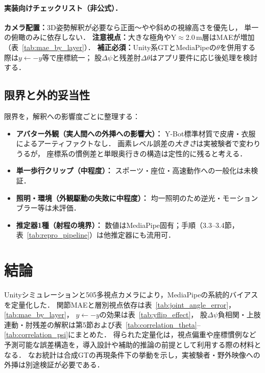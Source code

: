 \documentclass[fleqn]{ieej}
\begin{document}
\paragraph{実装向けチェックリスト（非公式）．}
\textbf{カメラ配置：}3D姿勢解釈が必要なら正面～やや斜めの視線高さを優先し，
単一の俯瞰のみに依存しない．
\textbf{注意視点：}大きな極角やY$\approx$2.0\,m層はMAEが増加（表~\ref{tab:mae_by_layer}）．
\textbf{補正必須：}Unity系GTとMediaPipeの$\theta$を併用する際は$y \leftarrow -y$等で座標統一；
股$\Delta\psi$と残差肘$\Delta\theta$はアプリ要件に応じ後処理を検討する．

\subsection{限界と外的妥当性}

限界を，解釈への影響度ごとに整理する：
\begin{itemize}\itemsep2pt
  \item \textbf{アバター外観（実人間への外挿への影響大）：}
        Y-Bot標準材質で皮膚・衣服によるアーティファクトなし．
        画素レベル誤差の\emph{大きさ}は実被験者で変わりうるが，
        座標系の慣例差と単眼奥行きの構造は定性的に残ると考える．
  \item \textbf{単一歩行クリップ（中程度）：}
        スポーツ・座位・高速動作への一般化は未検証．
  \item \textbf{照明・環境（外観駆動の失敗に中程度）：}
        均一照明のため逆光・モーションブラー等は未評価．
  \item \textbf{推定器1種（射程の境界）：}
        数値はMediaPipe固有；手順（3.3--3.4節，表~\ref{tab:repro_pipeline}）は他推定器にも流用可．
\end{itemize}

\section{結論}

Unityシミュレーションと505多視点カメラにより，MediaPipeの系統的バイアスを定量化した．
関節MAEと層別視点依存は表~\ref{tab:joint_angle_error}，\ref{tab:mae_by_layer}，
$y\leftarrow -y$の効果は表~\ref{tab:yflip_effect}，
股$\Delta\psi$負相関・上肢連動・肘残差の解釈は第5節および表~\ref{tab:correlation_theta}--\ref{tab:correlation_psi}にまとめた．
得られた定量化は，視点偏重や座標慣例など予測可能な誤差構造を，導入設計や補助的推論の前提として利用する際の材料となる．
なお統計は合成GTの再現条件下の挙動を示し，実被験者・野外映像への外挿は別途検証が必要である．
\end{document}
